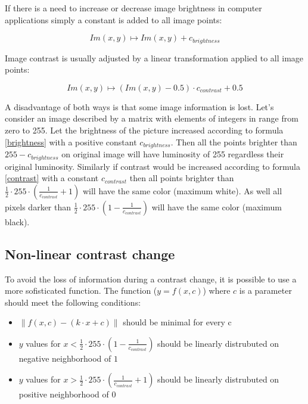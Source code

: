 If there is a need to increase or decrease image brightness in computer applications simply a constant is added to all image points:

\begin{equation}
\label{brightness}
  Im(x,y) \longmapsto Im(x,y) + c_{brightness} 
\end{equation}

Image contrast is usually adjusted by a linear transformation applied to all image points:

\begin{equation}
\label{contrast}
  Im(x,y) \longmapsto   (Im(x,y) - 0.5) \cdot c_{contrast} + 0.5
\end{equation}

A disadvantage of both ways is that some image information is lost. Let's consider an image described by a matrix with elements of integers in range from zero to 255. Let the brightness of the picture increased according to formula \eqref{brightness} with a positive constant $ c_{brightness} $. Then all the points brighter than $ 255 - c_{brightness} $ on original image will have luminosity of 255 regardless their original luminosity. Similarly if contrast would be increased according to formula \eqref{contrast} with a constant $ c_{contrast} $ then all points brighter than $ \frac{1}{2} \cdot 255 \cdot (\frac{1}{c_{contrast}}+1) $ will have the same color (maximum white). As well all pixels darker than $ \frac{1}{2} \cdot 255 \cdot (1 - \frac{1}{c_{contrast}}) $ will have the same color (maximum black).

\subsection{Non-linear contrast change}
To avoid the loss of information during a contrast change, it is possible to use a more sofisticated function. 
The function ($y=f(x,c)$) where $c$ is a parameter should meet the following conditions:
\begin{itemize}
\item $\|f(x,c) - (k \cdot x + c)\|$ should be minimal for every c
\item $y$ values for $x<\frac{1}{2} \cdot 255 \cdot (1 - \frac{1}{c_{contrast}})$ should be linearly distrubuted on negative neighborhood of $1$
\item $y$ values for $x>\frac{1}{2} \cdot 255 \cdot (\frac{1}{c_{contrast}}+1)$ should be linearly distrubuted on positive neighborhood of $0$
\end{itemize}

